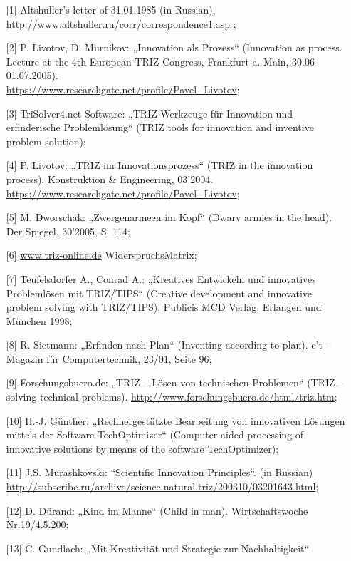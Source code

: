 \documentclass[11pt,a4paper]{article}
\begin{document}
\begin{itemize}
\item[{[1]}] Altshuller's letter of 31.01.1985 (in Russian),\\
  \url{http://www.altshuller.ru/corr/correspondence1.asp} ;
\item[{[2]}] P. Livotov, D. Murnikov: „Innovation als Prozess“ (Innovation as
  process. Lecture at the 4th European TRIZ Congress, Frankfurt a. Main,
  30.06-01.07.2005).\\
  \url{https://www.researchgate.net/profile/Pavel_Livotov}; 
\item[{[3]}] TriSolver4.net Software: „TRIZ-Werkzeuge für Innovation und
  erfinderische Problem\-lösung“ (TRIZ tools for innovation and inventive
  problem solution);
\item[{[4]}] P. Livotov: „TRIZ im Innovationsprozess“ (TRIZ in the innovation
  process). Konstruktion \& Engineering, 03'2004.\\
  \url{https://www.researchgate.net/profile/Pavel_Livotov};
\item[{[5]}] M. Dworschak: „Zwergenarmeen im Kopf“ (Dwarv armies in the head).
  Der Spiegel, 30’2005, S. 114;
\item[{[6]}] \url{www.triz-online.de} WiderspruchsMatrix;
\item[{[7]}] Teufelsdorfer A., Conrad A.: „Kreatives Entwickeln und
  innovatives Problemlösen mit TRIZ/TIPS“ (Creative development and innovative
  problem solving with TRIZ/TIPS), Publicis MCD Verlag, Erlangen und München
  1998;
\item[{[8]}] R. Sietmann: „Erfinden nach Plan“ (Inventing according to plan).
  c't -- Magazin für Computertechnik, 23/01, Seite 96;
\item[{[9]}] Forschungsbuero.de: „TRIZ -- Lösen von technischen Problemen“
  (TRIZ -- solving technical problems).
  \url{http://www.forschungsbuero.de/html/triz.htm};
\item[{[10]}] H.-J. Günther: „Rechnergestützte Bearbeitung von innovativen
  Lösungen mittels der Software TechOptimizer“ (Computer-aided processing of
  innovative solutions by means of the software TechOptimizer);
\item[{[11]}] J.S. Murashkovski: “Scientific Innovation Principles“.  (in
  Russian)\\
  \url{http://subscribe.ru/archive/science.natural.triz/200310/03201643.html};
\item[{[12]}] D. Dürand: „Kind im Manne“ (Child in man). Wirtschaftswoche
  Nr.19/4.5.200; 
\item[{[13]}] C. Gundlach: „Mit Kreativität und Strategie zur Nachhaltigkeit“

\end{itemize}
\end{document}
